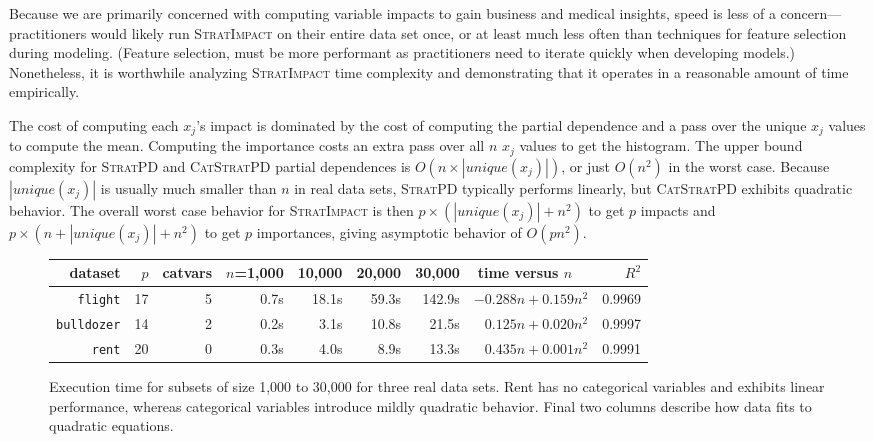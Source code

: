 \documentclass[11pt]{article}
\newcommand{\simp}{\fontfamily{cmr}\textsc{\small StratImpact}}
\newcommand{\spd}{\fontfamily{cmr}\textsc{\small StratPD}}
\newcommand{\cspd}{\fontfamily{cmr}\textsc{\small CatStratPD}}
\begin{document}
Because we are primarily concerned with computing variable impacts to gain business and medical insights, speed is less of a concern---practitioners would likely run \simp{} on their entire data set once, or at least much less often than techniques for feature selection during modeling. (Feature selection, must be more performant as practitioners need to iterate quickly when developing models.)   Nonetheless, it is worthwhile analyzing \simp{} time complexity and demonstrating that it operates in a reasonable amount of time empirically.

The cost of computing each $x_j$'s impact is dominated by the cost of computing the partial dependence and a pass over the unique $x_j$ values to compute the mean. Computing the importance costs an extra pass over all $n$ $x_j$ values to get the histogram. The upper bound  complexity for \spd{} and \cspd{} partial dependences is $O(n \times |unique(x_j)|)$, or just $O(n^2)$ in the worst case.   Because $|unique(x_j)|$ is usually much smaller than $n$ in real data sets, \spd{} typically performs linearly, but \cspd{} exhibits quadratic behavior.  The overall worst case behavior for \simp{} is then $p \times (|unique(x_j)| + n^2)$ to get $p$ impacts and $p \times (n + |unique(x_j)| + n^2)$  to get $p$ importances, giving asymptotic behavior of $O(pn^2)$.

\begin{figure}
\centering
\begin{tabular}{r r r r r r r r r}
{\bf dataset} & $p$ & catvars & {\small $n$=1,000} & {\small 10,000} & {\small 20,000} & {\small 30,000} & time versus $n$~~ & $R^2$\\
\hline
{\tt\small flight} & 17 & 5 & 0.7s & 18.1s & 59.3s & 142.9s & {\small $-0.288 n + 0.159 n^2$} & {\small 0.9969}\\
{\tt\small bulldozer} & 14 & 2 & 0.2s & 3.1s & 10.8s & 21.5s & {\small $0.125 n + 0.020 n^2$} & {\small 0.9997}\\
{\tt\small rent} & 20 & 0 & 0.3s & 4.0s & 8.9s & 13.3s & {\small $0.435 n + 0.001 n^2$} & {\small 0.9991}\\
\end{tabular}

\caption{\small  Execution time for subsets of size 1,000 to 30,000 for three real data sets. Rent has no categorical variables and exhibits linear performance, whereas categorical variables introduce mildly quadratic behavior. Final two columns describe how data fits to quadratic equations.}
\label{fig:timing}
\end{figure}
\end{document}
